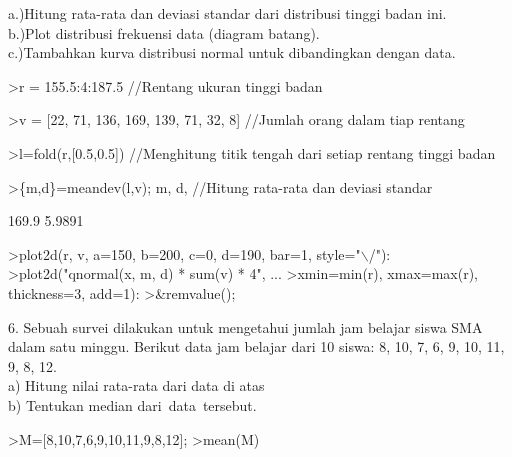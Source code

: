 \documentclass{article}
\begin{document}
\begin{eulernotebook}
\begin{eulercomment}
\begin{eulercomment}
\begin{eulercomment}
\begin{eulercomment}
\begin{eulercomment}
\begin{eulercomment}
\begin{eulercomment}
\begin{eulercomment}
\begin{eulercomment}
\begin{eulercomment}
\begin{eulercomment}
\begin{eulercomment}
\begin{eulercomment}
\begin{eulercomment}
\begin{eulercomment}
\begin{eulercomment}
\begin{eulercomment}
a.)Hitung rata-rata dan deviasi standar dari distribusi tinggi badan
ini.\\
b.)Plot distribusi frekuensi data (diagram batang).\\
c.)Tambahkan kurva distribusi normal untuk dibandingkan dengan data.
\end{eulercomment}
\begin{eulerprompt}
>r = 155.5:4:187.5  //Rentang ukuran tinggi badan
\end{eulerprompt}
\begin{euleroutput}
  [155.5,  159.5,  163.5,  167.5,  171.5,  175.5,  179.5,  183.5,  187.5]
\end{euleroutput}
\begin{eulerprompt}
>v = [22, 71, 136, 169, 139, 71, 32, 8] //Jumlah orang dalam tiap rentang
\end{eulerprompt}
\begin{euleroutput}
  [22,  71,  136,  169,  139,  71,  32,  8]
\end{euleroutput}
\begin{eulerprompt}
>l=fold(r,[0.5,0.5])  //Menghitung titik tengah dari setiap rentang tinggi badan
\end{eulerprompt}
\begin{euleroutput}
  [157.5,  161.5,  165.5,  169.5,  173.5,  177.5,  181.5,  185.5]
\end{euleroutput}
\begin{eulerprompt}
>\{m,d\}=meandev(l,v); m, d,  //Hitung rata-rata dan deviasi standar
\end{eulerprompt}
\begin{euleroutput}
  169.9
  5.9891
\end{euleroutput}
\begin{eulerprompt}
>plot2d(r, v, a=150, b=200, c=0, d=190, bar=1, style="\(\backslash\)/"):
>plot2d("qnormal(x, m, d) * sum(v) * 4", ...
>xmin=min(r), xmax=max(r), thickness=3, add=1):
>&remvalue();
\end{eulerprompt}
\begin{eulercomment}
6. Sebuah survei dilakukan untuk mengetahui jumlah jam belajar siswa
SMA dalam satu minggu. Berikut data jam belajar dari 10 siswa: 8, 10,
7, 6, 9, 10, 11, 9, 8, 12.\\
a) Hitung nilai rata-rata dari data di atas\\
b) Tentukan median dari data tersebut.
\end{eulercomment}
\begin{eulerprompt}
>M=[8,10,7,6,9,10,11,9,8,12];
>mean(M)

\end{eulerprompt}
\end{eulercomment}
\end{eulercomment}
\end{eulercomment}
\end{eulercomment}
\end{eulercomment}
\end{eulercomment}
\end{eulercomment}
\end{eulercomment}
\end{eulercomment}
\end{eulercomment}
\end{eulercomment}
\end{eulercomment}
\end{eulercomment}
\end{eulercomment}
\end{eulercomment}
\end{eulercomment}
\end{eulernotebook}
\end{document}
